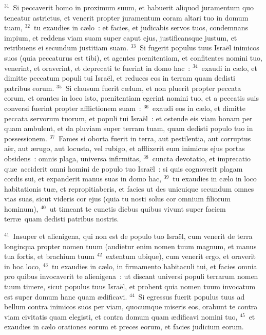 ${}^{31}$~Si peccaverit homo in proximum suum, et habuerit aliquod juramentum quo teneatur astrictus, et venerit propter juramentum coram altari tuo in domum tuam,
${}^{32}$~tu exaudies in c\ae lo~: et facies, et judicabis servos tuos, condemnans impium, et reddens viam suam super caput ejus, justificansque justum, et retribuens ei secundum justitiam suam.
${}^{33}$~Si fugerit populus tuus Isra\"el inimicos suos (quia peccaturus est tibi), et agentes pœnitentiam, et confitentes nomini tuo, venerint, et oraverint, et deprecati te fuerint in domo hac~:
${}^{34}$~exaudi in c\ae lo, et dimitte peccatum populi tui Isra\"el, et reduces eos in terram quam dedisti patribus eorum.
${}^{35}$~Si clausum fuerit c\ae lum, et non pluerit propter peccata eorum, et orantes in loco isto, pœnitentiam egerint nomini tuo, et a peccatis suis conversi fuerint propter afflictionem suam~:
${}^{36}$~exaudi eos in c\ae lo, et dimitte peccata servorum tuorum, et populi tui Isra\"el~: et ostende eis viam bonam per quam ambulent, et da pluviam super terram tuam, quam dedisti populo tuo in possessionem.
${}^{37}$~Fames si oborta fuerit in terra, aut pestilentia, aut corruptus a\"er, aut \ae rugo, aut locusta, vel rubigo, et afflixerit eum inimicus ejus portas obsidens~: omnis plaga, universa infirmitas,
${}^{38}$~cuncta devotatio, et imprecatio qu\ae\ acciderit omni homini de populo tuo Isra\"el~: si quis cognoverit plagam cordis sui, et expanderit manus suas in domo hac,
${}^{39}$~tu exaudies in c\ae lo in loco habitationis tu\ae , et repropitiaberis, et facies ut des unicuique secundum omnes vias suas, sicut videris cor ejus (quia tu nosti solus cor omnium filiorum hominum),
${}^{40}$~ut timeant te cunctis diebus quibus vivunt super faciem terr\ae\ quam dedisti patribus nostris.


${}^{41}$~Insuper et alienigena, qui non est de populo tuo Isra\"el, cum venerit de terra longinqua propter nomen tuum (audietur enim nomen tuum magnum, et manus tua fortis, et brachium tuum
${}^{42}$~extentum ubique), cum venerit ergo, et oraverit in hoc loco,
${}^{43}$~tu exaudies in c\ae lo, in firmamento habitaculi tui, et facies omnia pro quibus invocaverit te alienigena~: ut discant universi populi terrarum nomen tuum timere, sicut populus tuus Isra\"el, et probent quia nomen tuum invocatum est super domum hanc quam \ae dificavi.
${}^{44}$~Si egressus fuerit populus tuus ad bellum contra inimicos suos per viam, quocumque miseris eos, orabunt te contra viam civitatis quam elegisti, et contra domum quam \ae dificavi nomini tuo,
${}^{45}$~et exaudies in c\ae lo orationes eorum et preces eorum, et facies judicium eorum.


